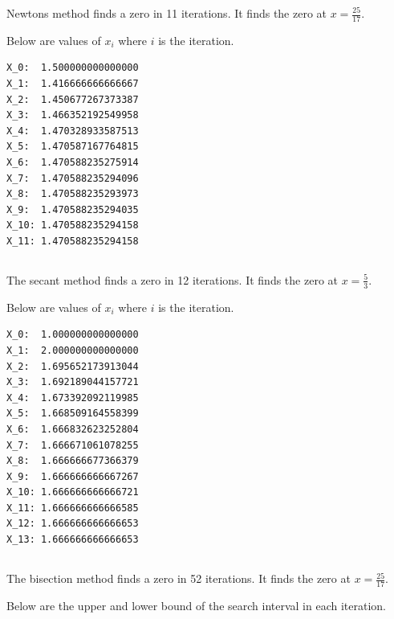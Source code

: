 \documentclass[12pt]{article}
\begin{document}
Newtons method finds a zero in 11 iterations. It finds the zero at $x = \frac{25}{17}$.

Below are values of $x_i$ where $i$ is the iteration. 

\begin{minipage}{\linewidth} 
\begin{lstlisting}
X_0:  1.500000000000000
X_1:  1.416666666666667
X_2:  1.450677267373387
X_3:  1.466352192549958
X_4:  1.470328933587513
X_5:  1.470587167764815
X_6:  1.470588235275914
X_7:  1.470588235294096
X_8:  1.470588235293973
X_9:  1.470588235294035
X_10: 1.470588235294158
X_11: 1.470588235294158
\end{lstlisting}
\end{minipage}

\subsection{}

The secant method finds a zero in 12 iterations. It finds the zero at $x = \frac{5}{3}$.

Below are values of $x_i$ where $i$ is the iteration.


\begin{minipage}{\linewidth}
\begin{lstlisting}
X_0:  1.000000000000000 
X_1:  2.000000000000000 
X_2:  1.695652173913044 
X_3:  1.692189044157721 
X_4:  1.673392092119985 
X_5:  1.668509164558399 
X_6:  1.666832623252804 
X_7:  1.666671061078255 
X_8:  1.666666677366379 
X_9:  1.666666666667267 
X_10: 1.666666666666721 
X_11: 1.666666666666585 
X_12: 1.666666666666653 
X_13: 1.666666666666653 
\end{lstlisting}
\end{minipage}

\subsection{}

The bisection method finds a zero in 52 iterations. It finds the zero at $x = \frac{25}{17}$.

Below are the upper and lower bound of the search interval in each iteration.
\end{document}
